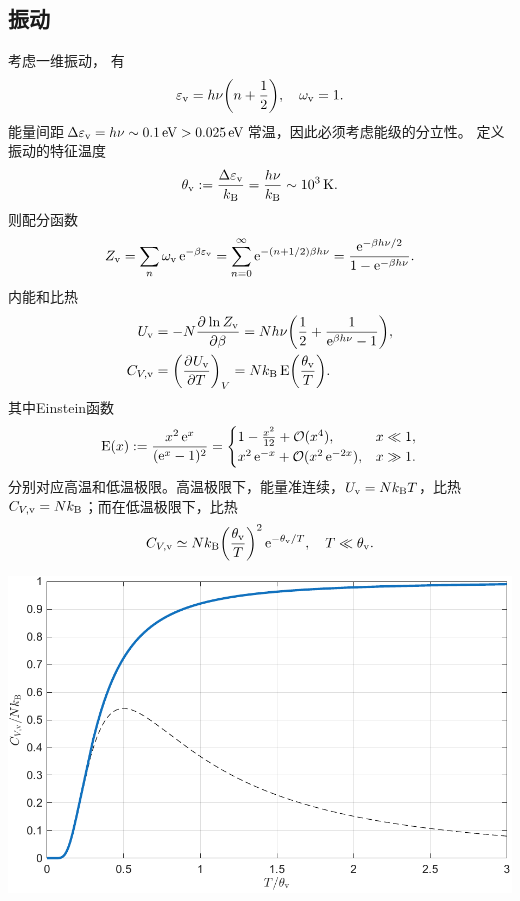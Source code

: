 \subsection{振动}
\label{ssec:vibration}

考虑一维振动，%
有
\[
	\varepsilon_\vb=h\nu\biggkh{n+\frac12},\quad\omega_\vb=1.
\]
能量间距$\D\varepsilon_\vb=h\nu\sim\SI{0.1}\electronvolt>\SI{0.025}\electronvolt$常温，因此必须考虑能级的分立性。
定义振动的特征温度
\[
	\theta_\vb:=\frac{\D\varepsilon_\vb}\kB=\frac{h\nu}\kB\sim\SI{e3}\K.
\]
则配分函数
\begin{equation}
	Z_\vb=\sum_n\omega_\vb\e{-\beta\varepsilon_\vb}=\sum_{n=0}^\infty\e{-(n+1/2)\beta h\nu}=\frac{\e{-\beta h\nu/2}}{1-\e{-\beta h\nu}}.
\end{equation}
内能和比热
\begin{subequations}
	\begin{align}
		U_\vb&=-N\pv{\ln Z_\vb}\beta=Nh\nu\biggkh{\frac12+\frac1{\e{\beta h\nu}-1}},\\
		C_{V,\vb}&=\pu[V]{U_\vb}T=N\kB\Einst\biggkh{\frac{\theta_\vb}T}.
	\end{align}
\end{subequations}
其中Einstein函数
\[
	\Einst(x):=\frac{x^2\e x}{(\e x-1)^2}=
	\begin{cases}
		1-\frac{x^2}{12}+\bigo(x^4),&x\ll 1,\\
		x^2\e{-x}+\bigo(x^2\e{-2x}),&x\gg 1.
	\end{cases}
\]
分别对应高温和低温极限。高温极限下，能量准连续，$U_\vb=N\kB T$，比热$C_{V,\vb}=N\kB$；而在低温极限下，比热
\begin{equation}
	C_{V,\vb}\simeq N\kB\biggkh{\frac{\theta_\vb}T}^2\e{-\theta_\vb/T},\quad T\ll\theta_\vb.
\end{equation}

\begin{center}
	\includegraphics[width=0.8\linewidth]{figures/C_Vvib.pdf}
	\label{fig:C_Vvib - T}
\end{center}

